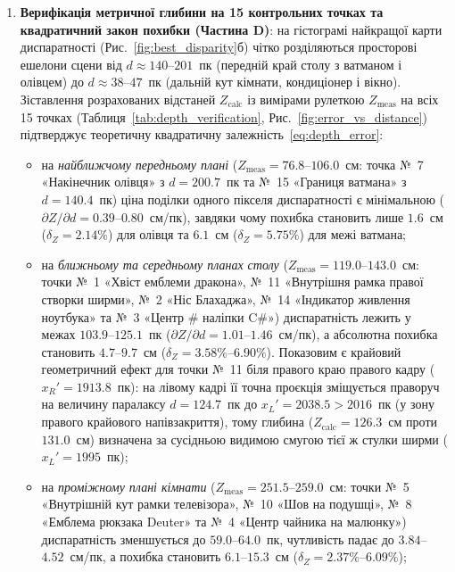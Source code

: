 \documentclass[14pt, a4paper]{extarticle}
\begin{document}
\begin{enumerate}
    \item \textbf{Верифікація метричної глибини на 15 контрольних точках та квадратичний закон похибки (Частина D)}: на гістограмі найкращої карти диспаратності (Рис.~\ref{fig:best_disparity}б) чітко розділяються просторові ешелони сцени від $d \approx 140$--$201$~пк (передній край столу з ватманом і олівцем) до $d \approx 38$--$47$~пк (дальній кут кімнати, кондиціонер і вікно). Зіставлення розрахованих відстаней $Z_{\text{calc}}$ із вимірами рулеткою $Z_{\text{meas}}$ на всіх 15 точках (Таблиця~\ref{tab:depth_verification}, Рис.~\ref{fig:error_vs_distance}) підтверджує теоретичну квадратичну залежність~\eqref{eq:depth_error}:
    \begin{itemize}
        \item на \textit{найближчому передньому плані} ($Z_{\text{meas}} = 76.8$--$106.0$~см: точка №~7 «Накінечник олівця» з $d = 200.7$~пк та №~15 «Границя ватмана» з $d = 140.4$~пк) ціна поділки одного пікселя диспаратності є мінімальною ($\partial Z / \partial d = 0.39$--$0.80$~см/пк), завдяки чому похибка становить лише $\mathbf{1.6}$~см ($\delta_Z = \mathbf{2.14\%}$) для олівця та $\mathbf{6.1}$~см ($\delta_Z = 5.75\%$) для межі ватмана;
        \item на \textit{ближньому та середньому планах столу} ($Z_{\text{meas}} = 119.0$--$143.0$~см: точки №~1 «Хвіст емблеми дракона», №~11 «Внутрішня рамка правої створки ширми», №~2 «Ніс Блахаджа», №~14 «Індикатор живлення ноутбука» та №~3 «Центр \# наліпки C\#») диспаратність лежить у межах $103.9$--$125.1$~пк ($\partial Z / \partial d = 1.01$--$1.46$~см/пк), а абсолютна похибка становить $\mathbf{4.7}$--$\mathbf{9.7}$~см ($\delta_Z = 3.58\%$--$6.90\%$). Показовим є крайовий геометричний ефект для точки №~11 біля правого краю правого кадру ($x_R' = 1913.8$~пк): на лівому кадрі її точна проєкція зміщується праворуч на величину паралаксу $d = 124.7$~пк до $x_L' = 2038.5 > 2016$~пк (у зону правого крайового напівзакриття), тому глибина ($Z_{\text{calc}} = 126.3$~см проти $131.0$~см) визначена за сусідньою видимою смугою тієї ж стулки ширми ($x_L' = 1995$~пк);
        \item на \textit{проміжному плані кімнати} ($Z_{\text{meas}} = 251.5$--$259.0$~см: точки №~5 «Внутрішній кут рамки телевізора», №~10 «Шов на подушці», №~8 «Емблема рюкзака Deuter» та №~4 «Центр чайника на малюнку») диспаратність зменшується до $59.0$--$64.0$~пк, чутливість падає до $3.84$--$4.52$~см/пк, а похибка становить $\mathbf{6.1}$--$\mathbf{15.3}$~см ($\delta_Z = 2.37\%$--$6.09\%$);

\end{itemize}
\end{enumerate}
\end{document}
